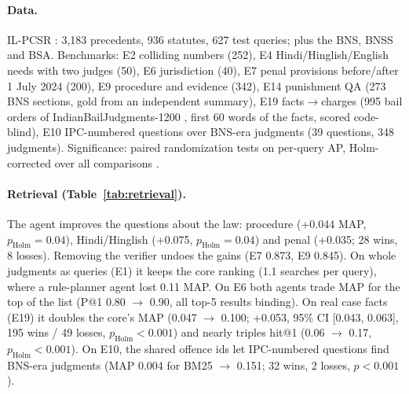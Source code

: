 \documentclass[11pt]{article}
\begin{document}
\paragraph{Data.} IL-PCSR \citep{ilpcsr}: 3,183 precedents, 936 statutes, 627 test queries; plus
the BNS, BNSS and BSA. Benchmarks: E2 colliding numbers (252), E4 Hindi/Hinglish/English needs with
two judges (50), E6 jurisdiction (40), E7 penal provisions before/after 1 July 2024 (200), E9
procedure and evidence (342), E14 punishment QA (273 BNS sections, gold from an independent
summary), E19 facts$\rightarrow$charges (995 bail orders of IndianBailJudgments-1200
\citep{bail1200}, first 60 words of the facts, scored code-blind), E10 IPC-numbered questions over
BNS-era judgments (39 questions, 348 judgments). Significance: paired randomization tests on
per-query AP, Holm-corrected over all comparisons \citep{smucker2007}.

\paragraph{Retrieval (Table~\ref{tab:retrieval}).} The agent improves the questions about the
law: procedure (+0.044 MAP, $p_{\text{Holm}}=0.04$), Hindi/Hinglish (+0.075, $p_{\text{Holm}}=0.04$)
and penal (+0.035; 28 wins, 8 losses). Removing the verifier undoes the gains (E7 0.873, E9 0.845).
On whole judgments as queries (E1) it keeps the core ranking (1.1 searches per query), where a
rule-planner agent lost 0.11 MAP. On E6 both agents trade MAP for the top of the list (P@1 0.80
$\rightarrow$ 0.90, all top-5 results binding). On real case facts (E19) it doubles the core's MAP
(0.047 $\rightarrow$ 0.100; +0.053, 95\% CI [0.043, 0.063], 195 wins / 49 losses,
$p_{\text{Holm}}<0.001$) and nearly triples hit@1 (0.06 $\rightarrow$ 0.17, $p_{\text{Holm}}<0.001$). On E10, the shared offence ids let IPC-numbered
questions find BNS-era judgments (MAP 0.004 for BM25 $\rightarrow$ 0.151; 32 wins, 2 losses,
$p<0.001$).
\end{document}
